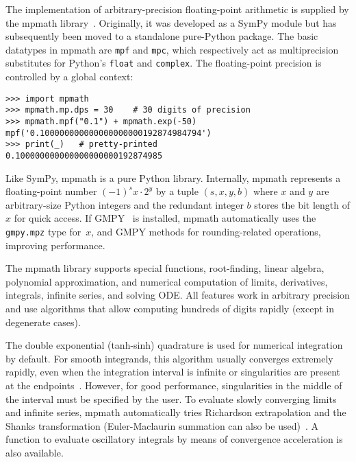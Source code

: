 The implementation of arbitrary-precision floating-point arithmetic is
supplied by the mpmath library~\cite{mpmath}. Originally, it was developed as a SymPy
module but has subsequently been moved to a standalone pure-Python package.
The basic datatypes in mpmath are \texttt{mpf} and \texttt{mpc}, which
respectively act as multiprecision substitutes for Python's \texttt{float} and
\texttt{complex}. The floating-point precision is controlled by a global
context:

\begin{verbatim}
>>> import mpmath
>>> mpmath.mp.dps = 30    # 30 digits of precision
>>> mpmath.mpf("0.1") + mpmath.exp(-50)
mpf('0.100000000000000000000192874984794')
>>> print(_)   # pretty-printed
0.100000000000000000000192874985
\end{verbatim}

Like SymPy, mpmath is a pure Python library.
Internally, mpmath represents a floating-point number
${(-1)}^s x \cdot 2^y$ by a tuple $(s, x, y, b)$ where
$x$ and $y$ are arbitrary-size Python integers
and the redundant integer $b$ stores the bit length of $x$ for quick access.
If GMPY~\cite{GMPY} is installed, mpmath automatically uses
the \texttt{gmpy.mpz} type for~$x$, and GMPY methods
for rounding-related operations, improving performance.

The mpmath library supports
special functions, root-finding, linear algebra, polynomial approximation,
and numerical computation of limits, derivatives, integrals, infinite
series, and solving ODE. All features work in arbitrary precision
and use algorithms that allow computing hundreds of digits rapidly
(except in degenerate cases).

The double exponential (tanh-sinh) quadrature is used for numerical
integration by default. For smooth integrands, this algorithm usually
converges extremely rapidly, even when the integration interval is infinite
or singularities are present at the endpoints~\cite{takahasi1974double,bailey2005comparison}.
However, for good performance, singularities
in the middle of the interval must be specified
by the user.
To evaluate slowly converging limits and infinite series, mpmath
automatically tries Richardson extrapolation and the
Shanks transformation
(Euler-Maclaurin summation can also be used)~\cite{BenderOrszag1999}.
A function to evaluate oscillatory integrals by means of convergence
acceleration is also available.

